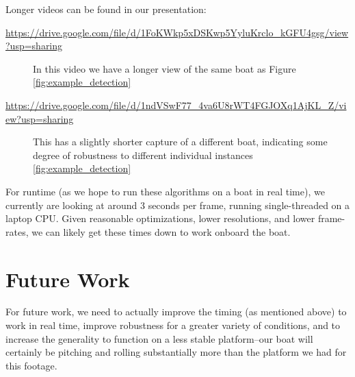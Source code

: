 \documentclass{article}
\begin{document}
Longer videos can be found in our presentation:

\begin{description}
\item[\url{https://drive.google.com/file/d/1FoKWkp5xDSKwp5YyluKrclo_kGFU4gsg/view?usp=sharing}]
  In this video we have a longer view of the same boat as Figure
  \ref{fig:example_detection}
\item[\url{https://drive.google.com/file/d/1ndVSwF77_4va6U8rWT4FGJOXq1AjKL_Z/view?usp=sharing}]
  This has a slightly shorter capture of a different boat, indicating some
  degree of robustness to different individual instances
  \ref{fig:example_detection}
\end{description}

For runtime (as we hope to run these algorithms on a boat in real time),
we currently are looking at around 3 seconds per frame, running single-threaded
on a laptop CPU. Given reasonable optimizations, lower resolutions, and lower
frame-rates, we can likely get these times down to work onboard the boat.

\section{Future Work}

For future work, we need to actually improve the timing (as mentioned above) to
work in real time, improve robustness for a greater variety of conditions, and
to increase the generality to function on a less stable platform--our boat will
certainly be pitching and rolling substantially more than the platform we had
for this footage.
\end{document}
